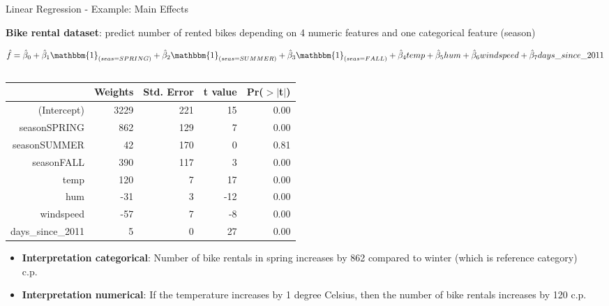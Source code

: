 \documentclass[11pt,compress,t,notes=noshow, aspectratio=169, xcolor=table]{beamer}
\begin{document}
\begin{frame}{Linear Regression - Example: Main Effects}

\textbf{Bike rental dataset}: predict number of rented bikes depending on 4 numeric features and one categorical feature (season)
\begin{footnotesize}
$$
\hat f = \hat \beta_0 + \hat \beta_1 \mathbbm{1}_{(seas = SPRING)} + \hat \beta_2 \mathbbm{1}_{(seas = SUMMER)} + \hat \beta_3 \mathbbm{1}_{(seas = FALL)} + \hat \beta_4 temp + \hat \beta_5 hum + \hat \beta_6 windspeed + \hat \beta_7 days\_since\_2011
$$
\end{footnotesize}
\vspace*{-0.3cm}
\pause
\begin{columns}[T]
\begin{column}{0.52\textwidth}
\begin{tiny}
\begin{table}[ht]
\centering
\begin{tabular}{rrrrr}
  \hline
 & Weights & Std. Error & t value & Pr($>$$|$t$|$) \\ 
  \hline
(Intercept) & 3229 & 221 & 15 & 0.00 \\ 
  seasonSPRING & 862 & 129 & 7 & 0.00 \\ 
  seasonSUMMER & 42 & 170 & 0 & 0.81 \\ 
  seasonFALL & 390 & 117 & 3 & 0.00 \\ 
  temp & 120 & 7 & 17 & 0.00 \\ 
  hum & -31 & 3 & -12 & 0.00 \\ 
  windspeed & -57 & 7 & -8 & 0.00 \\ 
  days\_since\_2011 & 5 & 0 & 27 & 0.00 \\ 
   \hline
\end{tabular}
\end{table}
\end{tiny}
\pause
\begin{itemize}
    \item \textbf{Interpretation categorical}: Number of bike rentals in spring increases by 862 compared to winter (which is reference category) c.p.
    \item \textbf{Interpretation numerical}: If the temperature increases by 1 degree Celsius, then the number of bike rentals increases by 120 c.p.
\end{itemize}
%
\end{column}\hfill
\pause
\begin{column}{0.47\textwidth}  %

\end{column}
\end{columns}
\end{frame}
\end{document}
